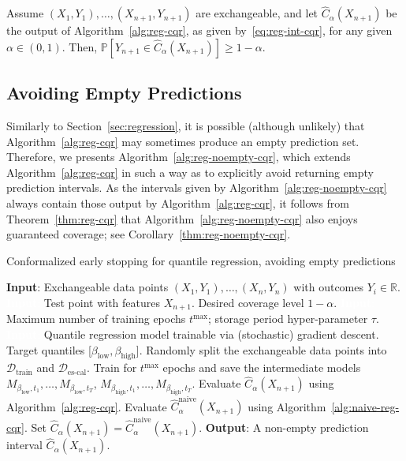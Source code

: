 \addtocounter{theorem}{1}
\begin{theorem} \label{thm:reg-cqr}
Assume $(X_{1},Y_{1}), \ldots, (X_{n+1},Y_{n+1})$ are exchangeable, and let $\hat{C}_{\alpha}(X_{n+1})$ be the output of Algorithm~\ref{alg:reg-cqr}, as given by~\eqref{eq:reg-int-cqr}, for any given $\alpha \in (0,1)$.
Then, $\mathbb{P}[Y_{n+1} \in \hat{C}_{\alpha}(X_{n+1})] \geq 1-\alpha$.
\end{theorem}




\subsection{Avoiding Empty Predictions} \label{app:reg-noempty-quantile}

Similarly to Section~\ref{sec:regression}, it is possible (although unlikely) that Algorithm~\ref{alg:reg-cqr} may sometimes produce an empty prediction set.
Therefore, we presents Algorithm~\ref{alg:reg-noempty-cqr}, which extends Algorithm~\ref{alg:reg-cqr} in such a way as to explicitly avoid returning empty prediction intervals.
As the intervals given by Algorithm~\ref{alg:reg-noempty-cqr} always contain those output by Algorithm~\ref{alg:reg-cqr}, it follows from Theorem~\ref{thm:reg-cqr} that Algorithm~\ref{alg:reg-noempty-cqr} also enjoys guaranteed coverage; see Corollary~\ref{thm:reg-noempty-cqr}.

\begin{algorithm}[H]
    \caption{Conformalized early stopping for quantile regression, avoiding empty predictions}
    \label{alg:reg-noempty-cqr}
    \begin{algorithmic}[1]
        \STATE \textbf{Input}: Exchangeable data points $(X_{1},Y_{1}), \ldots, (X_{n},Y_{n})$ with outcomes $Y_i \in \mathbb{R}$.
        \STATE \textcolor{white}{\textbf{Input}:} Test point with features $X_{n+1}$. Desired coverage level $1-\alpha$.
        \STATE \textcolor{white}{\textbf{Input}:} Maximum number of training epochs $t^{\text{max}}$; storage period hyper-parameter $\tau$.
        \STATE \textcolor{white}{\textbf{Input}:} Quantile regression model trainable via (stochastic) gradient descent. Target quantiles [$\beta_{\text{low}}, \beta_{\text{high}}$].
        \STATE Randomly split the exchangeable data points into $\mathcal{D}_{\text{train}}$ and $\mathcal{D}_{\text{es-cal}}$.
        \STATE Train for $t^{\text{max}}$ epochs and save the intermediate models $M_{\beta_{\text{low}}, t_1} , \dots, M_{\beta_{\text{low}}, t_T}$, $M_{\beta_{\text{high}}, t_1} , \dots, M_{\beta_{\text{high}}, t_T}$.
        \STATE Evaluate $\hat{C}_{\alpha}(X_{n+1})$ using Algorithm~\ref{alg:reg-cqr}.
        \STATE Evaluate $\hat{C}^{\text{naive}}_{\alpha}(X_{n+1})$ using Algorithm~\ref{alg:naive-reg-cqr}. Set $\hat{C}_{\alpha}(X_{n+1}) = \hat{C}^{\text{naive}}_{\alpha}(X_{n+1})$.
        \ENDIF
        \STATE \textbf{Output}: A non-empty prediction interval $\hat{C}_{\alpha}(X_{n+1})$.
    \end{algorithmic}
\end{algorithm}


